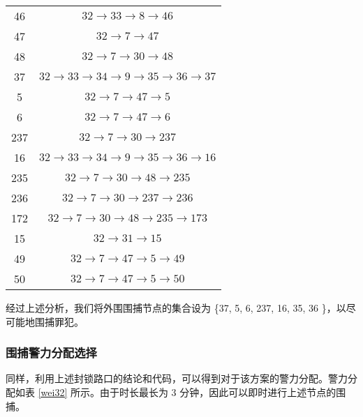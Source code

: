 \documentclass{cumcmthesis}
\begin{document}
\begin{center}
\begin{longtable}{cc}
          46                               & $32 \to 33  \to 8   \to 46 $                         \\
          47                               & $32 \to 7   \to 47 $                                 \\
          48                               & $32 \to 7   \to 30  \to 48 $                         \\
          37                               & $32 \to 33  \to 34  \to 9   \to 35  \to 36  \to 37 $ \\
          5                                & $32 \to 7   \to 47  \to 5  $                         \\
          6                                & $32 \to 7   \to 47  \to 6  $                         \\
          237                              & $32 \to 7   \to 30  \to 237     $                    \\
          16                               & $32 \to 33  \to 34  \to 9   \to 35  \to 36  \to 16 $ \\
          235                              & $32 \to 7   \to 30  \to 48  \to 235     $            \\
          236                              & $32 \to 7   \to 30  \to 237 \to 236     $            \\
          172                              & $32 \to 7   \to 30  \to 48  \to 235 \to 173     $    \\
          15                               & $32 \to 31  \to 15 $                                 \\
          49                               & $32 \to 7   \to 47  \to 5   \to 49 $                 \\
          50                               & $32 \to 7   \to 47  \to 5   \to 50 $                 \\
          \bottomrule[1pt]
        \end{longtable}
      \end{center}

      经过上述分析，我们将外围围捕节点的集合设为 \{37, 5, 6, 237, 16, 35, 36 \}，以尽可能地围捕罪犯。


    \subsubsection{围捕警力分配选择}

      同样，利用上述封锁路口的结论和代码，可以得到对于该方案的警力分配。警力分配如表 \ref{wei32} 所示。由于时长最长为 3 分钟，因此可以即时进行上述节点的围捕。
\end{document}
